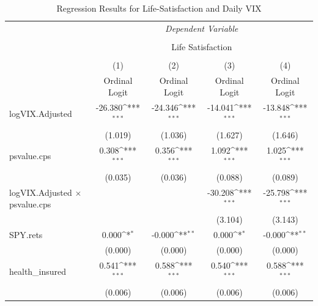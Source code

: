 \documentclass[11pt,a4paper,oldfontcommands]{memoir}
\begin{document}
{\begin{footnotesize}
\begin{footnotesize}
\def\sym#1{\ifmmode^{#1}\else\(^{#1}\)\fi}
\begin{longtable}{l*{4}{c}}
\caption{Regression Results for Life-Satisfaction and Daily VIX} \\
\hline\hline
& \multicolumn{4}{c}{ \textit{Dependent Variable}} \\
\cline{2-5}\\[-4ex]
& \multicolumn{4}{c}{Life Satisfaction}\\
\\[-4ex]
                    &\multicolumn{1}{c}{(1)}&\multicolumn{1}{c}{(2)}&\multicolumn{1}{c}{(3)}&\multicolumn{1}{c}{(4)}\\
                    &\multicolumn{1}{c}{Ordinal Logit}&\multicolumn{1}{c}{Ordinal Logit}&\multicolumn{1}{c}{Ordinal Logit}&\multicolumn{1}{c}{Ordinal Logit}\\
\hline
logVIX.Adjusted     &      -26.380\sym{***}&      -24.346\sym{***}&      -14.041\sym{***}&      -13.848\sym{***}\\
                    &     (1.019)         &     (1.036)         &     (1.627)         &     (1.646)         \\
 
psvalue.cps         &       0.308\sym{***}&       0.356\sym{***}&       1.092\sym{***}&       1.025\sym{***}\\
                    &     (0.035)         &     (0.036)         &     (0.088)         &     (0.089)         \\
logVIX.Adjusted $\times$ psvalue.cps&                     &                     &     -30.208\sym{***}&     -25.798\sym{***}\\
                    &                     &                     &     (3.104)         &     (3.143)         \\
                    
SPY.rets            &       0.000\sym{*}  &      -0.000\sym{**} &       0.000\sym{*}  &      -0.000\sym{**} \\
                    &     (0.000)         &     (0.000)         &     (0.000)         &     (0.000)         \\
 
health\_insured      &       0.541\sym{***}&       0.588\sym{***}&       0.540\sym{***}&       0.588\sym{***}\\
                    &     (0.006)         &     (0.006)         &     (0.006)         &     (0.006)         \\
 

\end{longtable}
\end{footnotesize}
\end{footnotesize}}
\end{document}
